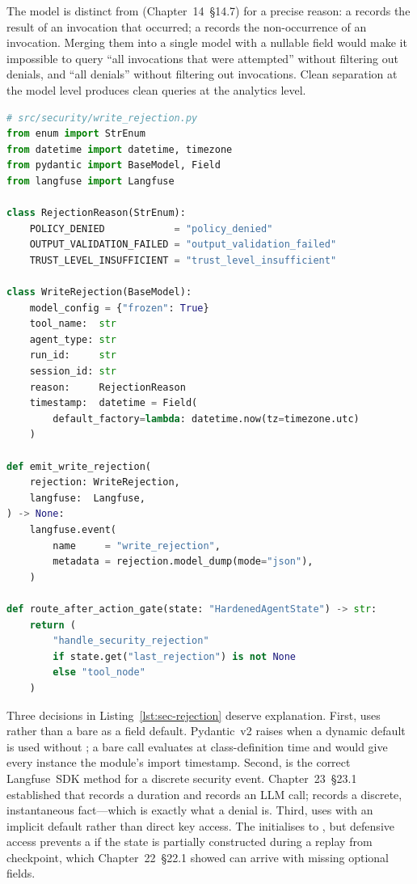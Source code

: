 The  model is distinct from
 (Chapter~14~\S14.7) for a precise reason:
a  records the result of an invocation that
occurred; a  records the non-occurrence of an
invocation. Merging them into a single model with a nullable
 field would make it impossible to query ``all invocations
that were attempted'' without filtering out denials, and ``all denials''
without filtering out invocations. Clean separation at the model level
produces clean queries at the analytics level.

\begin{lstlisting}[language=Python,
  caption={RejectionReason, WriteRejection, emit and routing helpers},
  label={lst:sec-rejection}]
# src/security/write_rejection.py
from enum import StrEnum
from datetime import datetime, timezone
from pydantic import BaseModel, Field
from langfuse import Langfuse

class RejectionReason(StrEnum):
    POLICY_DENIED            = "policy_denied"
    OUTPUT_VALIDATION_FAILED = "output_validation_failed"
    TRUST_LEVEL_INSUFFICIENT = "trust_level_insufficient"

class WriteRejection(BaseModel):
    model_config = {"frozen": True}
    tool_name:  str
    agent_type: str
    run_id:     str
    session_id: str
    reason:     RejectionReason
    timestamp:  datetime = Field(
        default_factory=lambda: datetime.now(tz=timezone.utc)
    )

def emit_write_rejection(
    rejection: WriteRejection,
    langfuse:  Langfuse,
) -> None:
    langfuse.event(
        name     = "write_rejection",
        metadata = rejection.model_dump(mode="json"),
    )

def route_after_action_gate(state: "HardenedAgentState") -> str:
    return (
        "handle_security_rejection"
        if state.get("last_rejection") is not None
        else "tool_node"
    )
\end{lstlisting}

Three decisions in Listing~\ref{lst:sec-rejection} deserve explanation.
First,  uses
rather than a bare  as a field default. Pydantic~v2
raises  when a dynamic default is used without
; a bare call evaluates at class-definition time
and would give every  instance the module's import
timestamp. Second,  is the correct Langfuse~SDK
method for a discrete security event. Chapter~23~\S23.1 established
that  records a duration and
 records an LLM call; 
records a discrete, instantaneous fact---which is exactly what a denial
is. Third,  uses  with
an implicit  default rather than direct key access.
The  initialises  to
, but defensive  access prevents a
 if the state is partially constructed during a replay
from checkpoint, which Chapter~22~\S22.1 showed can arrive with
missing optional fields.

